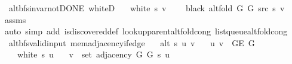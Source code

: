 \begin{isabellebody}
%
\endisadeliminvisible
%
\isataginvisible
{}\isamarkupfalse%
\ {\isacharparenleft}{\kern0pt}\ alt{\isacharunderscore}{\kern0pt}bfs{\isacharunderscore}{\kern0pt}invar{\isacharunderscore}{\kern0pt}not{\isacharunderscore}{\kern0pt}DONE{\isacharparenright}{\kern0pt}\ whiteD{\isacharcolon}{\kern0pt}\isanewline
\ \ \ {\isachardoublequoteopen}white\ s\ v{\isachardoublequoteclose}\isanewline
\ \ \ {\isachardoublequoteopen}{\isasymnot}\ black\ {\isacharparenleft}{\kern0pt}alt{\isacharunderscore}{\kern0pt}fold\ G{}\ G{}\ src\ s{\isacharparenright}{\kern0pt}\ v{\isachardoublequoteclose}%
\endisataginvisible
{\isafoldinvisible}%
%
\isadeliminvisible
\isanewline
%
\endisadeliminvisible
%
\isadelimproof
\ \ %
\endisadelimproof
%
\isatagproof
{}\isamarkupfalse%
\ assms\isanewline
\ \ \isamarkupfalse%
\ {\isacharparenleft}{\kern0pt}auto\ simp\ add{\isacharcolon}{\kern0pt}\ is{\isacharunderscore}{\kern0pt}discovered{\isacharunderscore}{\kern0pt}def\ lookup{\isacharunderscore}{\kern0pt}parent{\isacharunderscore}{\kern0pt}alt{\isacharunderscore}{\kern0pt}fold{\isacharunderscore}{\kern0pt}cong\ list{\isacharunderscore}{\kern0pt}queue{\isacharunderscore}{\kern0pt}alt{\isacharunderscore}{\kern0pt}fold{\isacharunderscore}{\kern0pt}cong{\isacharparenright}{\kern0pt}%
\endisatagproof
{\isafoldproof}%
%
\isadelimproof
\isanewline
%
\endisadelimproof
%
\isadeliminvisible
\isanewline
%
\endisadeliminvisible
%
\isataginvisible
{}\isamarkupfalse%
\ {\isacharparenleft}{\kern0pt}\ alt{\isacharunderscore}{\kern0pt}bfs{\isacharunderscore}{\kern0pt}valid{\isacharunderscore}{\kern0pt}input{\isacharparenright}{\kern0pt}\ mem{\isacharunderscore}{\kern0pt}adjacency{\isacharunderscore}{\kern0pt}if{\isacharunderscore}{\kern0pt}edge{\isacharcolon}{\kern0pt}\isanewline
\ \ \ {\isachardoublequoteopen}alt\ s\ u\ v{\isachardoublequoteclose}\isanewline
\ \ \ {\isachardoublequoteopen}{\isacharbraceleft}{\kern0pt}u{\isacharcomma}{\kern0pt}\ v{\isacharbraceright}{\kern0pt}\ {\isasymin}\ G{\isachardot}{\kern0pt}E\ G{\isachardoublequoteclose}\isanewline
\ \ \ {\isachardoublequoteopen}{\isasymnot}\ white\ s\ u{\isachardoublequoteclose}\isanewline
\ \ \ {\isachardoublequoteopen}v\ {\isasymin}\ set\ {\isacharparenleft}{\kern0pt}adjacency\ G{}\ G{}\ s\ u{\isacharparenright}{\kern0pt}{\isachardoublequoteclose}%
\endisataginvisible
{\isafoldinvisible}%
%
\isadeliminvisible

\end{isabellebody}
